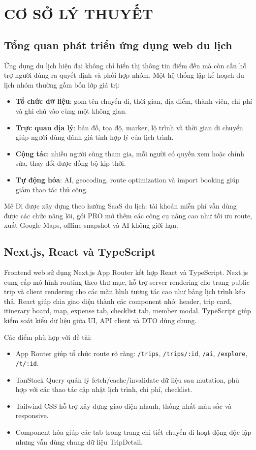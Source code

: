 \documentclass[a4paper]{report}
\newcommand{\ProjectName}{Mê Đi}
\begin{document}
\chapter{CƠ SỞ LÝ THUYẾT}

\section{Tổng quan phát triển ứng dụng web du lịch}

Ứng dụng du lịch hiện đại không chỉ hiển thị thông tin điểm đến mà còn cần hỗ trợ người dùng ra quyết định và phối hợp nhóm. Một hệ thống lập kế hoạch du lịch nhóm thường gồm bốn lớp giá trị:

\begin{itemize}
  \item \textbf{Tổ chức dữ liệu}: gom tên chuyến đi, thời gian, địa điểm, thành viên, chi phí và ghi chú vào cùng một không gian.
  \item \textbf{Trực quan địa lý}: bản đồ, tọa độ, marker, lộ trình và thời gian di chuyển giúp người dùng đánh giá tính hợp lý của lịch trình.
  \item \textbf{Cộng tác}: nhiều người cùng tham gia, mỗi người có quyền xem hoặc chỉnh sửa, thay đổi được đồng bộ kịp thời.
  \item \textbf{Tự động hóa}: AI, geocoding, route optimization và import booking giúp giảm thao tác thủ công.
\end{itemize}

\ProjectName{} được xây dựng theo hướng SaaS du lịch: tài khoản miễn phí vẫn dùng được các chức năng lõi, gói PRO mở thêm các công cụ nâng cao như tối ưu route, xuất Google Maps, offline snapshot và AI không giới hạn.

\section{Next.js, React và TypeScript}

Frontend web sử dụng Next.js App Router kết hợp React và TypeScript. Next.js cung cấp mô hình routing theo thư mục, hỗ trợ server rendering cho trang public trip và client rendering cho các màn hình tương tác cao như bảng lịch trình kéo thả. React giúp chia giao diện thành các component nhỏ: header, trip card, itinerary board, map, expense tab, checklist tab, member modal. TypeScript giúp kiểm soát kiểu dữ liệu giữa UI, API client và DTO dùng chung.

Các điểm phù hợp với đề tài:

\begin{itemize}
  \item App Router giúp tổ chức route rõ ràng: \texttt{/trips}, \texttt{/trips/:id}, \texttt{/ai}, \texttt{/explore}, \texttt{/t/:id}.
  \item TanStack Query quản lý fetch/cache/invalidate dữ liệu sau mutation, phù hợp với các thao tác cập nhật lịch trình, chi phí, checklist.
  \item Tailwind CSS hỗ trợ xây dựng giao diện nhanh, thống nhất màu sắc và responsive.
  \item Component hóa giúp các tab trong trang chi tiết chuyến đi hoạt động độc lập nhưng vẫn dùng chung dữ liệu TripDetail.
\end{itemize}
\end{document}
